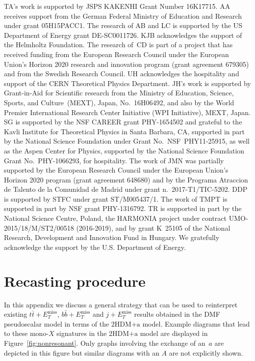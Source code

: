 \documentclass[a4paper, 11pt,notoc]{article}
\newcommand{\MET}{\ensuremath{E_T^\mathrm{miss}}\xspace}
\newcommand{\hdma}{\ensuremath{\textrm{2HDM+a}}\xspace}
\begin{document}
TA's work is supported by JSPS KAKENHI Grant Number 16K17715. AA receives support from the German Federal Ministry of Education and Research under grant 05H15PACC1. The research of AB and LC is supported by the US Department of Energy grant  DE-SC0011726. KJB acknowledges the support of the Helmholtz Foundation. The research of~CD is part of a project that has received funding from the European Research Council under the European Union's Horizon 2020 research and innovation program (grant agreement 679305) and from the Swedish Research Council.  UH acknowledges the hospitality and support of the CERN Theoretical Physics Department. JH's work is supported by Grant-in-Aid for Scientific research from the Ministry of Education, Science, Sports, and Culture~(MEXT), Japan, No.~16H06492, and also by the World Premier International Research Center Initiative (WPI Initiative), MEXT, Japan.  SG is supported by the NSF CAREER grant PHY-1654502 and grateful to  the Kavli Institute for Theoretical Physics in Santa Barbara, CA, supported in part by the National Science Foundation under Grant No.~NSF~PHY11-25915, as well as the Aspen Center for Physics, supported by the National Science Foundation Grant No.~PHY-1066293, for  hospitality. The work of JMN was partially supported by the European Research Council under the European Union's Horizon 2020 program (grant agreement 648680) and by the Programa Atraccion de Talento de la Comunidad de Madrid under grant n.~2017-T1/TIC-5202. DDP is supported by STFC under grant ST/M005437/1.  The work of TMPT is supported in part by NSF grant PHY-1316792. TR is supported in part by the National Science Centre, Poland, the HARMONIA project under contract UMO-2015/18/M/ST2/00518 (2016-2019), and by grant K~25105 of the National Research, Development and Innovation Fund in Hungary. We gratefully acknowledge the support by the U.S. Department of Energy. 


\appendix

\section{Recasting procedure}
\label{app:recast}

In this appendix we discuss  a general strategy that can be used to reinterpret existing $t \bar t + \MET$, $b \bar b + \MET$ and $j + \MET$ results obtained in the DMF pseudoscalar model in terms of the \hdma model. Example diagrams that lead to these mono-$X$ signatures in the \hdma model are displayed in Figure~\ref{fig:nonresonant}. Only graphs involving the exchange of an~$a$ are depicted in this figure but similar diagrams  with an  $A$ are not explicitly shown. 
\end{document}
